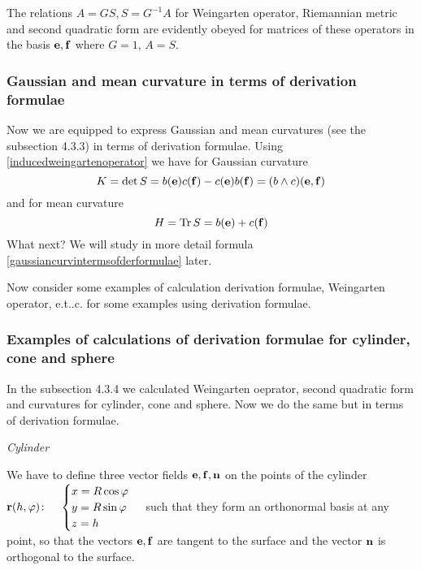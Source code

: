 \documentclass[12pt]{article}
\theoremstyle{theorem}
\numberwithin{equation}{section}
\begin{document}
The relations $A=GS, S=G^{-1}A$ for Weingarten operator, Riemannian metric and second quadratic form
are evidently obeyed for matrices of these operators in the basis ${{\bf e},{\bf f}}$ where $G=1$, $A=S$.

\subsubsection{Gaussian and mean curvature in terms of derivation formulae}
Now we are equipped to express Gaussian and mean curvatures (see the subsection 4.3.3) in terms of derivation formulae.
  Using \eqref{inducedweingartenoperator} we have for Gaussian curvature
           \begin{equation}\label{gaussiancurvintermsofderformulae}
            K=\det S=b({\bf e})c({\bf f})-c({\bf e})b({\bf f})=(b\wedge c)({\bf e},{\bf f})
           \end{equation}
 and for mean curvature
   \begin{equation}\label{meancurvintermsofderformulae}
            H={\rm Tr\,} S=b({\bf e})+c({\bf f})
           \end{equation}
 What next? We will  study in more detail formula \eqref{gaussiancurvintermsofderformulae} later.

 Now consider some examples of calculation derivation formulae, Weingarten operator, e.t..c. for
 some examples using derivation formulae.

 \subsubsection {Examples of calculations of derivation formulae for cylinder, cone and sphere }

 In the subsection 4.3.4 we calculated Weingarten oeprator, second quadratic form and curvatures
 for cylinder, cone and sphere.
 Now we do the same but in terms of derivation formulae.
\m

 {\it Cylinder}

\m



We have to define three vector fields
${{\bf e},{\bf f},{\bf n}}$ on the points of the cylinder ${\bf r}(h,\varphi)\colon\quad
  \begin{cases}
  x=R\cos\varphi\\
  y=R\sin\varphi\\
  z=h\\
  \end{cases}$
such that they form an orthonormal basis at any point, so that the vectors ${\bf e},{\bf f}$ are tangent to the surface
   and  the vector ${\bf n}$ is orthogonal to the surface.
\end{document}
